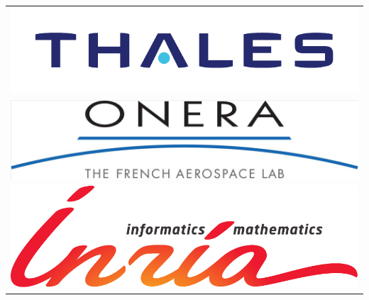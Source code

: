 \documentclass[portrait,a0paper,fontscale=0.277]{baposter}
\begin{document}
\begin{poster}
{\begin{tabular}[]{r}
\includegraphics[scale=0.4]{thales_q}\\
\includegraphics[scale=0.15]{ONERA_logo}\\
\includegraphics[scale=0.2]{logo_inria}
\end{tabular}

}


\newcommand{\colouredcircle}{%
\tikz{\useasboundingbox (-0.2em,-0.32em) rectangle(0.2em,0.32em); \draw[draw=black,fill=lightblue,line width=0.03em] (0,0) circle(0.18em);}}



\end{poster}
\end{document}
